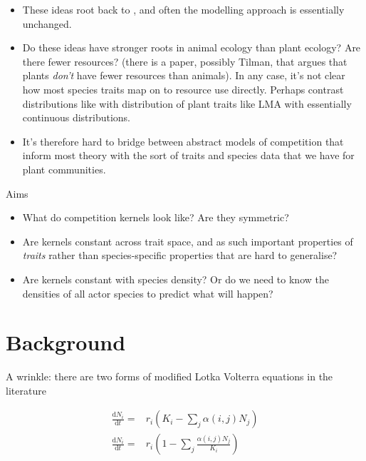 \documentclass[a4paper,11pt]{article}
\newcommand{\ud}{\ensuremath{\mathrm{d}}}
\begin{document}
\begin{itemize}
\item These ideas root back to \citet{MacArthur-1967}, and often the
  modelling approach is essentially unchanged.
\item Do these ideas have stronger roots in animal ecology than plant
  ecology?  Are there fewer resources?  (there is a paper, possibly
  Tilman, that argues that plants \emph{don't} have fewer resources
  than animals).  In any case, it's not clear how most species traits
  map on to resource use directly.  Perhaps contrast distributions
  like \citet{Hermoyian-2002} with distribution of plant traits like
  LMA with essentially continuous distributions.
\item It's therefore hard to bridge between abstract models of
  competition that inform most theory with the sort of traits and
  species data that we have for plant communities.
\end{itemize}

Aims

\begin{itemize}
\item What do competition kernels look like?  Are they symmetric?
\item Are kernels constant across trait space, and as such important
  properties of \emph{traits} rather than species-specific properties
  that are hard to generalise?
\item Are kernels constant with species density?  Or do we need to
  know the densities of all actor species to predict what will happen?
\end{itemize}

\section{Background}

A wrinkle: there are two forms of modified Lotka Volterra equations in
the literature

\begin{subequations}
  \label{eq:LV}
  \begin{align}
    \frac{\ud N_i}{\ud t} =& r_i\left(K_i  - \sum_j\alpha(i, j) N_j\right)\\
    \frac{\ud N_i}{\ud t} =&
    r_i\left(1 - \sum_j \frac{\alpha(i, j) N_j}{K_i}\right)
  \end{align}
\end{subequations}
\end{document}
